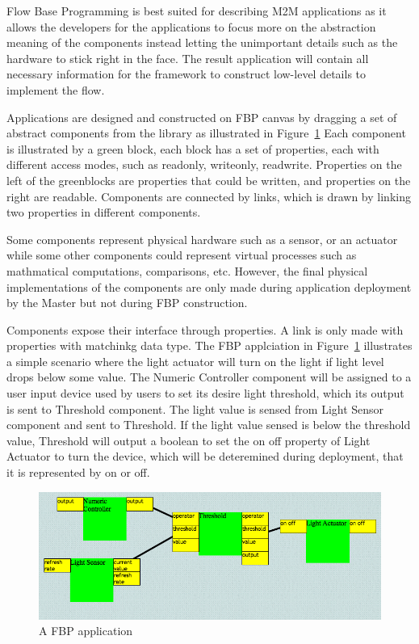 Flow Base Programming is best suited for describing M2M applications as it
allows the developers for the applications to focus more on the
abstraction meaning of the components instead letting the unimportant details
such as the hardware to stick right in the face. The result application will
contain all necessary information for the framework to construct low-level
details to implement the flow.

Applications are designed and constructed on FBP canvas by dragging a set of
abstract components from the library as illustrated in Figure~\ref{fig:fbp-application} 
Each component is
illustrated by a green block, each block has a set of properties, each with
different access modes, such as readonly, writeonly, readwrite. Properties on
the left of the greenblocks are properties that could be written, and
properties on the right are readable. Components are connected by links, which
is drawn by linking two properties in different components.

Some components represent physical hardware such as a sensor, or an actuator
while some other components could represent virtual processes such as
mathmatical computations, comparisons, etc. However, the final physical implementations
of the components are only made during application deployment by the Master but
not during FBP construction.

Components expose their interface through properties. A link is only made with
properties with matchinkg data type. The FBP applciation in
Figure~\ref{fig:fbp-application} illustrates a simple scenario where the light actuator
will turn on the light if light level drops below some value. The Numeric
Controller component will be assigned to a user input device used by users to
set its desire light threshold, which its output is sent to Threshold
component. The light value is sensed from Light Sensor component and sent to
Threshold. If the light value sensed is below the threshold value, Threshold
will output a boolean to set the on off property of Light Actuator to turn the
device, which will be deteremined during deployment, that it is represented by
on or off.

\begin{figure}[h!]
\centering
    \includegraphics[width=\linewidth]{figures/fbp-application}
\caption{A FBP application}
\label{fig:fbp-application}
\end{figure}

